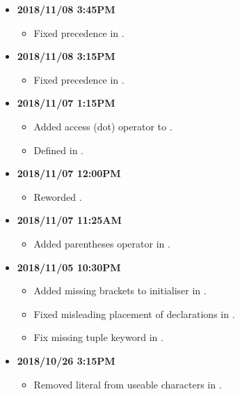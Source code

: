 \documentclass[../gazprea.tex]{subfiles}
\begin{document}
\begin{itemize}
  \item
    \textbf{2018/11/08 3:45PM}
    \begin{itemize}
      \item Fixed  precedence in  .
    \end{itemize}
  \item
    \textbf{2018/11/08 3:15PM}
    \begin{itemize}
      \item Fixed  precedence in  .
    \end{itemize}
  \item
    \textbf{2018/11/07 1:15PM}
    \begin{itemize}
      \item Added access (dot) operator to  .
      \item Defined  in  .
    \end{itemize}
  \item
    \textbf{2018/11/07 12:00PM}
    \begin{itemize}
      \item Reworded .
    \end{itemize}
  \item
    \textbf{2018/11/07 11:25AM}
    \begin{itemize}
      \item Added parentheses operator in  .
    \end{itemize}
  \item
    \textbf{2018/11/05 10:30PM}
    \begin{itemize}
      \item Added missing brackets to  initialiser in .
      \item Fixed misleading placement of declarations in .
      \item Fix missing tuple keyword in .
    \end{itemize}
  \item
    \textbf{2018/10/26 3:15PM}
    \begin{itemize}
      \item Removed literal \code{\\n} from useable characters in .

\end{itemize}
\end{itemize}
\end{document}

